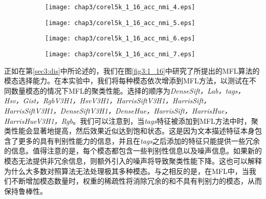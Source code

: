 \begin{figure}[t]
	\centering
	\begin{subfigure}{0.49\textwidth}
		\centering
		\texttt{[image: chap3/corel5k\_1\_16\_acc\_nmi\_4.eps]}
		\caption{}
		\label{fig3:1_16_acc_nmi_4}
	\end{subfigure}
	\begin{subfigure}{0.49\textwidth}
		\centering
		\texttt{[image: chap3/corel5k\_1\_16\_acc\_nmi\_5.eps]}
		\caption{}
		\label{fig3:1_16_acc_nmi_5}
    \end{subfigure}
    
	\centering
	\begin{subfigure}{0.49\textwidth}
		\centering
		\texttt{[image: chap3/corel5k\_1\_16\_acc\_nmi\_6.eps]}
		\caption{}
		\label{fig3:1_16_acc_nmi_6}
	\end{subfigure}
	\begin{subfigure}{0.49\textwidth}
		\centering
		\texttt{[image: chap3/corel5k\_1\_16\_acc\_nmi\_7.eps]}
		\caption{}
		\label{fig3:1_16_acc_nmi_7}
	\end{subfigure}
    \label{fig3:1_16_more}
\end{figure}

正如在第\ref{sec3:dis}中所论述的，我们在图\ref{fig3:1_16}中研究了所提出的MFL算法的模态选择能力。在本实验中，我们将每种模态依次增添到MFL方法，以测试在不同数量模态的情况下MFL的聚类性能。选择的顺序为\textit{DenseSift，Lab，tags，Hsv，Gist，RgbV3H1，HsvV3H1，HarrisSiftV3H1，HarrisSift，HarrisSiftV3H1，DenseSiftV3H1，DenseHue，HarrisSift，HarrisHue，HarrisHueV3H1，Rgb}。我们可以注意到，当\textit{tags}特征被添加到MFL方法中时，聚类性能会显著地提高，然后效果近似达到饱和状态。这是因为文本描述特征本身包含了更多的具有判别性能力的信息，并且在\textit{tags}之后添加的特征只能提供一些冗余的信息。值得注意的是，每个模态都包含一些判别性信息以及噪声信息。如果新的模态无法提供非冗余信息，则额外引入的噪声将导致聚类性能下降。这也可以解释为什么大多数对照算法无法处理极其多种模态。与之相反的是，在MFL中，当我们不断增加模态数量时，权重的稀疏性将消除冗余的和不具有判别力的模态，从而保持鲁棒性。

